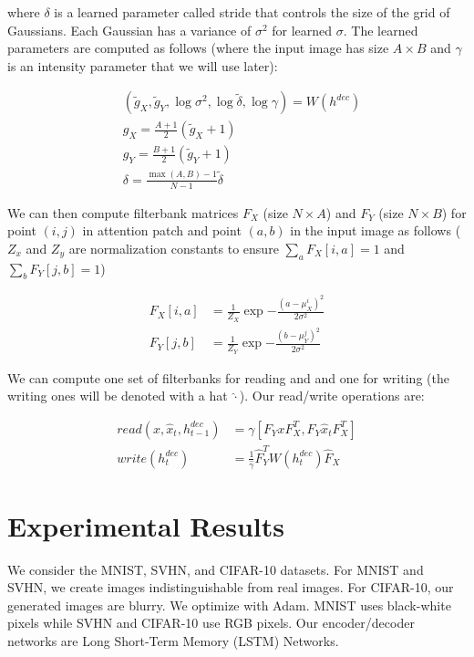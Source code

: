 \documentclass[a4paper]{article}
\begin{document}
where $\delta$ is a learned parameter called stride that controls the size
of the grid of Gaussians. Each Gaussian has a variance of $\sigma^2$ for
learned $\sigma$. The learned parameters are computed as follows (where the
input image has size $A \times B$ and $\gamma$ is an intensity parameter
that we will use later):

\begin{align}
  & (\tilde{g}_X, \tilde{g}_Y, \log{\sigma^2}, \log{\tilde{\delta}},
    \log{\gamma}) = W(h^{dec}) \\
  & g_X = \frac{A + 1}{2} (\tilde{g}_X + 1) \\
  & g_Y = \frac{B + 1}{2} (\tilde{g}_Y + 1) \\
  & \delta = \frac{\max(A, B) - 1}{N - 1} \tilde{\delta}
\end{align}

We can then compute filterbank matrices $F_X$ (size $N \times A$) and $F_Y$
(size $N \times B$) for point $(i, j)$ in attention patch and point $(a, b)$
in the input image as follows ($Z_x$ and $Z_y$ are normalization constants to
ensure $\sum_{a}{F_X[i, a]} = 1$ and $\sum_{b}{F_Y[j, b]} = 1$)

\begin{align}
  F_X[i, a] &= \frac{1}{Z_X} \exp{-\frac{(a - \mu_X^i)^2}{2 \sigma^2}} \\
  F_Y[j, b] &= \frac{1}{Z_Y} \exp{-\frac{(b - \mu_Y^j)^2}{2 \sigma^2}}
\end{align}

We can compute one set of filterbanks for reading and and one for writing (the
writing ones will be denoted with a hat $\hat{\cdot}$). Our read/write
operations are:

\begin{align}
  read(x, \hat{x}_t, h_{t-1}^{dec}) &=
    \gamma[F_Y x F_X^T, F_Y \hat{x}_t F_X^T] \\
  write(h_{t}^{dec}) &= \frac{1}{\hat{\gamma}} \hat{F}_Y^T W(h_{t}^{dec})
    \hat{F}_X
\end{align}

\section{Experimental Results}
We consider the MNIST, SVHN, and CIFAR-10 datasets. For MNIST and SVHN, we
create images indistinguishable from real images. For CIFAR-10, our
generated images are blurry. We optimize with Adam. MNIST uses black-white
pixels while SVHN and CIFAR-10 use RGB pixels. Our encoder/decoder networks
are Long Short-Term Memory (LSTM) Networks.
\end{document}
